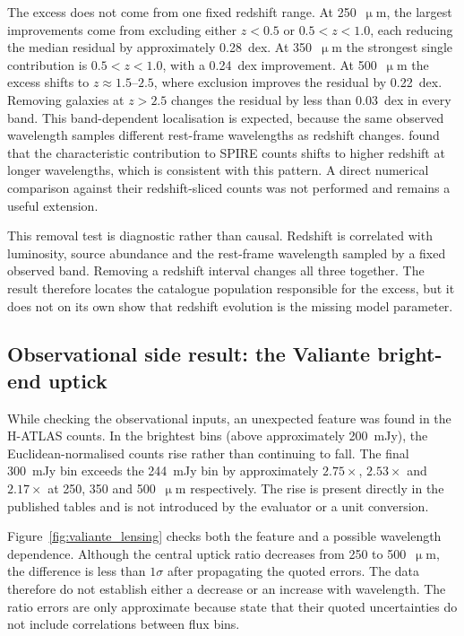 \documentclass[12pt,a4paper]{article}
\begin{document}
The excess does not come from one fixed redshift range. At 250~$\upmu$m, the
largest improvements come from excluding either $z<0.5$ or $0.5<z<1.0$, each reducing
the median residual by approximately \SI{0.28}{dex}. At 350~$\upmu$m the strongest
single contribution is $0.5<z<1.0$, with a \SI{0.24}{dex} improvement. At
500~$\upmu$m the excess shifts to $z \approx 1.5$--$2.5$, where exclusion improves the
residual by \SI{0.22}{dex}. Removing galaxies at $z>2.5$ changes the residual by less
than \SI{0.03}{dex} in every band. This band-dependent localisation is expected, because
the same observed wavelength samples different rest-frame wavelengths as redshift
changes. \citet{B_thermin_2012} found that the characteristic
contribution to SPIRE counts shifts to higher redshift at longer wavelengths, which is
consistent with this pattern. A direct numerical comparison against their
redshift-sliced counts was not performed and remains a useful extension.

This removal test is diagnostic rather than causal. Redshift is correlated with
luminosity, source abundance and the rest-frame wavelength sampled by a fixed observed
band. Removing a redshift interval changes all three together. The result therefore
locates the catalogue population responsible for the excess, but it does not on its own
show that redshift evolution is the missing model parameter.

\subsection{Observational side result: the Valiante bright-end uptick}
\label{sec:results:valiante}

While checking the observational inputs, an unexpected feature was found in the
\citet{Valiante_2016} H-ATLAS counts. In the brightest bins (above approximately
\SI{200}{mJy}), the Euclidean-normalised counts rise rather than continuing to fall.
The final \SI{300}{mJy} bin exceeds the \SI{244}{mJy} bin by approximately
$2.75\times$, $2.53\times$ and $2.17\times$ at 250, 350 and 500~$\upmu$m respectively.
The rise is present directly in the published tables and is not introduced by the
evaluator or a unit conversion.

Figure~\ref{fig:valiante_lensing} checks both the feature and a possible wavelength
dependence. Although the central uptick ratio decreases from 250 to 500~$\upmu$m, the
difference is less than $1\sigma$ after propagating the quoted errors. The data therefore
do not establish either a decrease or an increase with wavelength. The ratio errors are
only approximate because \citet{Valiante_2016} state that their quoted uncertainties do
not include correlations between flux bins.
\end{document}
